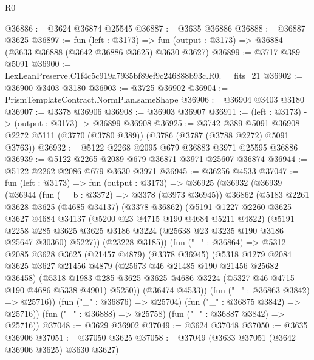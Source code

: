 \begin{lexlean}{R0}
\begin{coremodule}
@36886 := @3624 @36874 @25545
@36887 := @3635 @36886
@36888 := @36887 @3625
@36897 := fun (left : @3173) =>
  fun (output : @3173) => @36884 (@3633 @36888 (@3642 @36886 @3625) @3630 @3627)
@36899 := @3717 @389 @5091
@36900 := LexLeanPreserve.C1f4c5c919a7935bf89ef9c246888b93c.R0.__fits_21
@36902 := @36900 @3403 @3180
@36903 := @3725 @36902
@36904 := PrismTemplateContract.NormPlan.sameShape
@36906 := @36904 @3403 @3180
@36907 := @3378 @36906
@36908 := @36903 @36907
@36911 := (left : @3173) -> (output : @3173) -> @36899 @36908
@36925 := @3742
    @389
    @5091
    @36908
    @2272
    @5111
    (@3770 (@3780 @389))
    (@3786 (@3787 (@3788 @2272) @5091 @3763))
@36932 := @5122 @2268 @2095 @679 @36883 @3971 @25595 @36886
@36939 := @5122 @2265 @2089 @679 @36871 @3971 @25607 @36874
@36944 := @5122 @2262 @2086 @679 @3630 @3971
@36945 := @36256 @4533
@37047 := fun (left : @3173) =>
  fun (output : @3173) =>
  @36925
    (@36932
      (@36939
        (@36944
          (fun (__b : @3372) => @3378 (@3973 @36945))
          @36862
          (@5183
            @2261
            @3628
            @3625
            (@4685 @34137)
            (@3378 @36862)
            (@5191
              @1227
              @2260
              @3625
              @3627
              @4684
              @34137
              (@5200 @23 @4715 @190 @4684 @5211 @4822)
              (@5191
                @2258
                @285
                @3625
                @3625
                @3186
                @3224
                (@25638 @23 @3235 @190 @3186 @25647 @30360)
                @5227))
            (@23228 @3185))
          (fun ("_" : @36864) =>
          @5312
            @2085
            @3628
            @3625
            (@21457 @4879)
            (@3378 @36945)
            (@5318
              @1279
              @2084
              @3625
              @3627
              @21456
              @4879
              (@25673 @46 @21485 @190 @21456 @25682 @36458)
              (@5318
                @1983
                @285
                @3625
                @3625
                @4686
                @3224
                (@5327 @46 @4715 @190 @4686 @5338 @4901)
                @5250))
            (@36474 @4533))
          (fun ("_" : @36863 @3842) => @25716))
        (fun ("_" : @36876) => @25704)
        (fun ("_" : @36875 @3842) => @25716))
      (fun ("_" : @36888) => @25758)
      (fun ("_" : @36887 @3842) => @25716))
@37048 := @3629 @36902
@37049 := @3624 @37048
@37050 := @3635 @36906
@37051 := @37050 @3625
@37058 := @37049 (@3633 @37051 (@3642 @36906 @3625) @3630 @3627)

\end{coremodule}
\end{lexlean}
